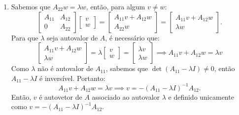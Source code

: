 \documentclass[a4paper,11pt]{article}
\begin{document}
\begin{enumerate}[label=\textbf{(\alph*)}]
            \item Sabemos que $A_{22}w = \lambda w $, então, para algum $v \neq w$:
                $$
                    \begin{bmatrix}
                        A_{11} & A_{12} \\
                        0 & A_{22}
                    \end{bmatrix}
                    \begin{bmatrix}
                        v \\
                        w
                    \end{bmatrix}
                    =
                    \begin{bmatrix}
                        A_{11}v + A_{12}w \\
                        A_{22}w
                    \end{bmatrix}
                    =
                    \begin{bmatrix}
                        A_{11}v + A_{12}w \\
                        \lambda w
                    \end{bmatrix}.
                $$
                Para que $\lambda$ seja autovalor de $A$, é necessário que:
                $$
                    \begin{bmatrix}
                        A_{11}v + A_{12}w \\
                        \lambda w
                    \end{bmatrix}
                     =
                    \lambda
                    \begin{bmatrix}
                        v \\
                        w
                    \end{bmatrix}
                    =
                     \begin{bmatrix}
                        \lambda v \\
                        \lambda w
                    \end{bmatrix}
                    \implies 
                    A_{11}v + A_{12}w = \lambda v
                $$
                Como $\lambda$ não é autovalor de $A_{11}$, sabemos que $\det(A_{11} - \lambda I) \neq 0$, então $A_{11} - \lambda I$ é inversível. Portanto:
                $$
                    A_{11}v + A_{12}w = \lambda v \implies v = -(A_{11} - \lambda I)^{-1}A_{12}.
                $$
                Então, $v$ é autovetor de $A$ associado ao autovalor $\lambda$ e definido unicamente como $v = -(A_{11} - \lambda I)^{-1}A_{12}$.
                

\end{enumerate}
\end{document}
